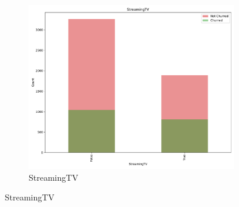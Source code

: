 \documentclass[a4paper,11pt]{article}
\begin{document}
\begin{landscape}
\begin{figure}
\begin{subfigure}{0.14\linewidth}
    \includegraphics[width=\linewidth]{figures/understanding/StreamingTV.pdf}
    \caption{StreamingTV}
\end{subfigure}


\end{figure}
\end{landscape}
\end{document}
